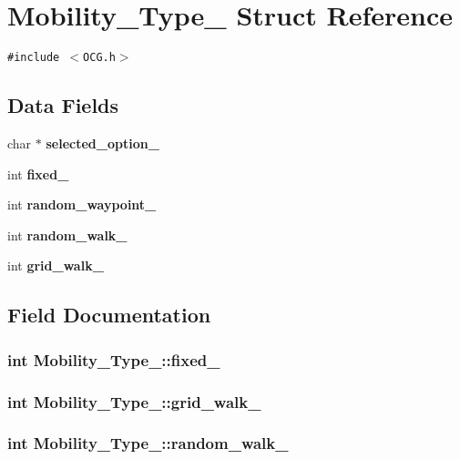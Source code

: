 \section{Mobility\_\-Type\_\- Struct Reference}
\label{structMobility__Type__}
{\tt \#include $<$OCG.h$>$}

\subsection*{Data Fields}
\begin{CompactItemize}
\item 
char $\ast$ {\bf selected\_\-option\_\-}
\item 
int {\bf fixed\_\-}
\item 
int {\bf random\_\-waypoint\_\-}
\item 
int {\bf random\_\-walk\_\-}
\item 
int {\bf grid\_\-walk\_\-}
\end{CompactItemize}


\subsection{Field Documentation}
\subsubsection[{fixed\_\-}]{\setlength{\rightskip}{0pt plus 5cm}int {\bf Mobility\_\-Type\_\-::fixed\_\-}}\label{structMobility__Type___66093ef926bba09b813eb6975c4b9a15}


\subsubsection[{grid\_\-walk\_\-}]{\setlength{\rightskip}{0pt plus 5cm}int {\bf Mobility\_\-Type\_\-::grid\_\-walk\_\-}}\label{structMobility__Type___5e8fe3cf9772dac329d45f0b0fd6b214}


\subsubsection[{random\_\-walk\_\-}]{\setlength{\rightskip}{0pt plus 5cm}int {\bf Mobility\_\-Type\_\-::random\_\-walk\_\-}}\label{structMobility__Type___38931385af054579d3ac6defb2d14ad2}


